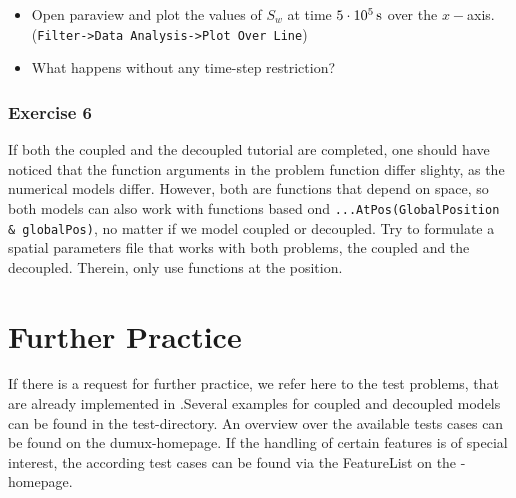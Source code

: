 \begin{itemize}
 \item Open paraview and plot the values of $S_w$ at time $\unit[5 \cdot 10^5]{s}$
 over the $x-$axis.\\ (\texttt{Filter->Data Analysis->Plot Over Line})
 \item What happens without any time-step restriction?
\end{itemize}

\subsubsection{Exercise 6}
If both the coupled and the decoupled tutorial are completed, one should have
noticed that the function arguments in the problem function differ slighty, as
the numerical models differ. However, both are functions that depend on space,
so both models can also work with functions based ond \mbox{\texttt{...AtPos(GlobalPosition \& globalPos)}},
no matter if we model coupled or decoupled. Try to formulate a spatial parameters
file that works with both problems, the coupled and the decoupled. Therein, only
use functions at the position.


\section{Further Practice}\label{tutorial-furtherpractice}

If there is a request for further practice, we refer here to the test problems, that 
are already implemented in \Dumux.Several examples for coupled and decoupled models 
can be found in the test-directory. An overview over the available tests cases can be 
found on the dumux-homepage.
If the handling of certain features is of special interest, the according test cases can be 
found via the FeatureList on the \Dumux-homepage.\\

